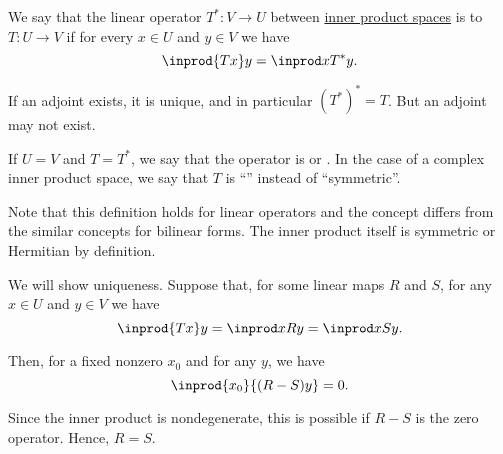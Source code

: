 \begin{definition}\label{def:adjoint_operator}
  We say that the linear operator \( T^*: V \to U \) between \hyperref[def:inner_product_space]{inner product spaces} is  to \( T: U \to V \) if for every \( x \in U \) and \( y \in V \) we have
  \begin{equation*}
    \inprod {Tx} y = \inprod x {T^* y}.
  \end{equation*}

  If an adjoint exists, it is unique, and in particular \( (T^*)^* = T \). But an adjoint may not exist.

  If \( U = V \) and \( T = T^* \), we say that the operator is  or . In the case of a complex inner product space, we say that \( T \) is \enquote{} instead of \enquote{symmetric}.

  Note that this definition holds for linear operators and the concept differs from the similar concepts for bilinear forms. The inner product itself is symmetric or Hermitian by definition.
\end{definition}
\begin{defproof}
  We will show uniqueness. Suppose that, for some linear maps \( R \) and \( S \), for any \( x \in U \) and \( y \in V \) we have
  \begin{equation*}
    \inprod {T x} y = \inprod x {R y} = \inprod x {S y}.
  \end{equation*}

  Then, for a fixed nonzero \( x_0 \) and for any \( y \), we have
  \begin{equation*}
    \inprod {x_0} {(R - S) y} = 0.
  \end{equation*}

  Since the inner product is nondegenerate, this is possible if \( R - S \) is the zero operator. Hence, \( R = S \).
\end{defproof}

